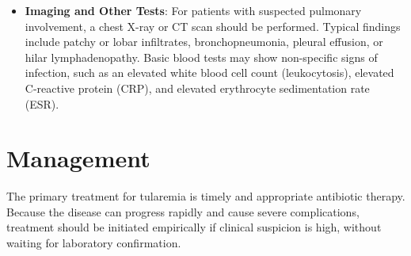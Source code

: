 \begin{itemize}
    \item \textbf{Imaging and Other Tests}: For patients with suspected pulmonary involvement, a chest X-ray or CT scan should be performed. Typical findings include patchy or lobar infiltrates, bronchopneumonia, pleural effusion, or hilar lymphadenopathy. Basic blood tests may show non-specific signs of infection, such as an elevated white blood cell count (leukocytosis), elevated C-reactive protein (CRP), and elevated erythrocyte sedimentation rate (ESR).
\end{itemize}

\section*{Management}
The primary treatment for tularemia is timely and appropriate antibiotic therapy. Because the disease can progress rapidly and cause severe complications, treatment should be initiated empirically if clinical suspicion is high, without waiting for laboratory confirmation.
